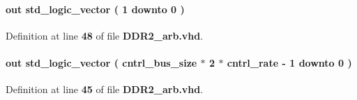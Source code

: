 \paragraph[{local\+\_\+size}]{ {\bfseries \textcolor{keywordflow}{out}\textcolor{vhdlchar}{ }} {\bfseries \textcolor{comment}{std\+\_\+logic\+\_\+vector}\textcolor{vhdlchar}{ }\textcolor{vhdlchar}{(}\textcolor{vhdlchar}{ }\textcolor{vhdlchar}{ } \textcolor{vhdldigit}{1} \textcolor{vhdlchar}{ }\textcolor{keywordflow}{downto}\textcolor{vhdlchar}{ }\textcolor{vhdlchar}{ } \textcolor{vhdldigit}{0} \textcolor{vhdlchar}{ }\textcolor{vhdlchar}{)}\textcolor{vhdlchar}{ }} \hspace{0.3cm}{\ttfamily [Port]}}\label{classDDR2__arb_ad0b46d0496a0bcc011fdafd77e36a6a8}


Definition at line {\bf 48} of file {\bf D\+D\+R2\+\_\+arb.\+vhd}.

\paragraph[{local\+\_\+wdata}]{ {\bfseries \textcolor{keywordflow}{out}\textcolor{vhdlchar}{ }} {\bfseries \textcolor{comment}{std\+\_\+logic\+\_\+vector}\textcolor{vhdlchar}{ }\textcolor{vhdlchar}{(}\textcolor{vhdlchar}{ }\textcolor{vhdlchar}{ }\textcolor{vhdlchar}{ }\textcolor{vhdlchar}{ }{\bfseries {\bf cntrl\+\_\+bus\+\_\+size}} \textcolor{vhdlchar}{$\ast$}\textcolor{vhdlchar}{ } \textcolor{vhdldigit}{2} \textcolor{vhdlchar}{$\ast$}\textcolor{vhdlchar}{ }\textcolor{vhdlchar}{ }\textcolor{vhdlchar}{ }{\bfseries {\bf cntrl\+\_\+rate}} \textcolor{vhdlchar}{-\/}\textcolor{vhdlchar}{ } \textcolor{vhdldigit}{1} \textcolor{vhdlchar}{ }\textcolor{keywordflow}{downto}\textcolor{vhdlchar}{ }\textcolor{vhdlchar}{ } \textcolor{vhdldigit}{0} \textcolor{vhdlchar}{ }\textcolor{vhdlchar}{)}\textcolor{vhdlchar}{ }} \hspace{0.3cm}{\ttfamily [Port]}}\label{classDDR2__arb_a40cd388bdd419ba842b58a9b440d232c}


Definition at line {\bf 45} of file {\bf D\+D\+R2\+\_\+arb.\+vhd}.

